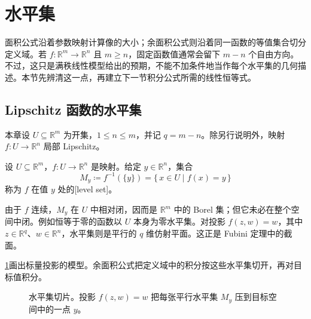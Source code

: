 \section{水平集}
\label{b1:sec:1801}

面积公式沿着参数映射计算像的大小；余面积公式则沿着同一函数的等值集合切分定义域。若 \(f:\mathbb R^m\rightarrow\mathbb R^n\) 且 \(m\geq n\)，固定函数值通常会留下 \(m-n\) 个自由方向。不过，这只是满秩线性模型给出的预期，不能不加条件地当作每个水平集的几何描述。本节先辨清这一点，再建立下一节积分公式所需的线性恒等式。


\subsection{Lipschitz 函数的水平集}
\label{b1:subsec:180101}

本章设 \(U\subseteq\mathbb R^m\) 为开集，\(1\leq n\leq m\)，并记 \(q=m-n\)。除另行说明外，映射 \(f:U\rightarrow\mathbb R^n\) 局部 Lipschitz。

\begin{definition}
\label{b1:def:level-set}
设 \(U\subseteq\mathbb R^m\)，\(f:U\to\mathbb R^n\) 是映射。给定 \(y\in\mathbb R^n\)，集合
\[
 M_y\coloneqq f^{-1}(\{y\})=\{\,x\in U\mid f(x)=y\,\}
\]
称为 \(f\) 在值 \(y\) 处的[level set]。
\end{definition}

由于 \(f\) 连续，\(M_y\) 在 \(U\) 中相对闭，因而是 \(\mathbb R^m\) 中的 Borel 集；但它未必在整个空间中闭。例如恒等于零的函数以 \(U\) 本身为零水平集。对投影 \(f(z,w)=w\)，其中 \(z\in\mathbb R^q\)、\(w\in\mathbb R^n\)，水平集则是平行的 \(q\) 维仿射平面。这正是 Fubini 定理中的截面。

\ProseParagraphBreak

\cref{b1:fig:level-set-slicing}画出标量投影的模型。余面积公式把定义域中的积分按这些水平集切开，再对目标值积分。
\begin{figure}[htbp]
  \centering
  \caption[水平集切片]{水平集切片。投影 \(f(z,w)=w\) 把每张平行水平集 \(M_y\) 压到目标空间中的一点 \(y\)。}
  \label{b1:fig:level-set-slicing}
\end{figure}

